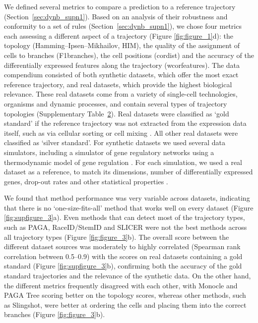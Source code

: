 We defined several metrics to compare a prediction to a reference trajectory (Section~\ref{sec:dynb_supn1}). Based on an analysis of their robustness and conformity to a set of rules (Section~\ref{sec:dynb_supn1}), we chose four metrics each assessing a different aspect of a trajectory (Figure \ref{fig:figure_1}d): the topology (Hamming–Ipsen–Mikhailov, HIM), the quality of the assignment of cells to branches (F1branches), the cell positions (cordist) and the accuracy of the differentially expressed features along the trajectory (wcorfeatures). The data compendium consisted of both synthetic datasets, which offer the most exact reference trajectory, and real datasets, which provide the highest biological relevance. These real datasets come from a variety of single-cell technologies, organisms and dynamic processes, and contain several types of trajectory topologies (Supplementary Table~\href{https://static-content.springer.com/esm/art\%3A10.1038\%2Fs41587-019-0071-9/MediaObjects/41587\_2019\_71\_MOESM4\_ESM.xlsx}{2}). Real datasets were classified as ‘gold standard’ if the reference trajectory was not extracted from the expression data itself, such as via cellular sorting or cell mixing \cite{tian_scrnaseqmixologybetter_2018}. All other real datasets were classified as ‘silver standard’. For synthetic datasets we used several data simulators, including a simulator of gene regulatory networks using a thermodynamic model of gene regulation \cite{schaffter_genenetweaversilicobenchmark_2011}. For each simulation, we used a real dataset as a reference, to match its dimensions, number of differentially expressed genes, drop-out rates and other statistical properties \cite{zappia_splattersimulationsinglecell_2017}.

We found that method performance was very variable across datasets, indicating that there is no ‘one-size-fits-all’ method that works well on every dataset (Figure \ref{fig:supfigure_3}a). Even methods that can detect most of the trajectory types, such as PAGA, RaceID/StemID and SLICER were not the best methods across all trajectory types (Figure \ref{fig:figure_3}b). The overall score between the different dataset sources was moderately to highly correlated (Spearman rank correlation between 0.5–0.9) with the scores on real datasets containing a gold standard (Figure \ref{fig:supfigure_3}b), confirming both the accuracy of the gold standard trajectories and the relevance of the synthetic data. On the other hand, the different metrics frequently disagreed with each other, with Monocle and PAGA Tree scoring better on the topology scores, whereas other methods, such as Slingshot, were better at ordering the cells and placing them into the correct branches (Figure \ref{fig:figure_3}b).



